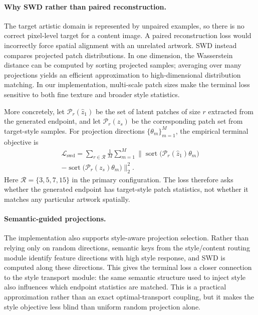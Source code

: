 ﻿\documentclass[letterpaper]{article}
\begin{document}
\paragraph{Why SWD rather than paired reconstruction.}
The target artistic domain is represented by unpaired examples, so there is no correct pixel-level target for a content image. A paired reconstruction loss would incorrectly force spatial alignment with an unrelated artwork. SWD instead compares projected patch distributions. In one dimension, the Wasserstein distance can be computed by sorting projected samples; averaging over many projections yields an efficient approximation to high-dimensional distribution matching. In our implementation, multi-scale patch sizes make the terminal loss sensitive to both fine texture and broader style statistics.

More concretely, let $\mathcal{P}_r(\hat{z}_1)$ be the set of latent patches of size $r$ extracted from the generated endpoint, and let $\mathcal{P}_r(z_s)$ be the corresponding patch set from target-style samples. For projection directions $\{\theta_m\}_{m=1}^M$, the empirical terminal objective is
\begin{multline}
    \mathcal{L}_{\mathrm{swd}} =
    \sum_{r\in\mathcal{R}} \frac{1}{M} \sum_{m=1}^{M}
    \bigl\|
    \operatorname{sort}\!\bigl(\mathcal{P}_r(\hat{z}_1)\theta_m\bigr) \\
    -
    \operatorname{sort}\!\bigl(\mathcal{P}_r(z_s)\theta_m\bigr)
    \bigr\|_2^2 .
\end{multline}
Here $\mathcal{R}=\{3,5,7,15\}$ in the primary configuration. The loss therefore asks whether the generated endpoint has target-style patch statistics, not whether it matches any particular artwork spatially.

\paragraph{Semantic-guided projections.}
The implementation also supports style-aware projection selection. Rather than relying only on random directions, semantic keys from the style/content routing module identify feature directions with high style response, and SWD is computed along these directions. This gives the terminal loss a closer connection to the style transport module: the same semantic structure used to inject style also influences which endpoint statistics are matched. This is a practical approximation rather than an exact optimal-transport coupling, but it makes the style objective less blind than uniform random projection alone.
\end{document}

